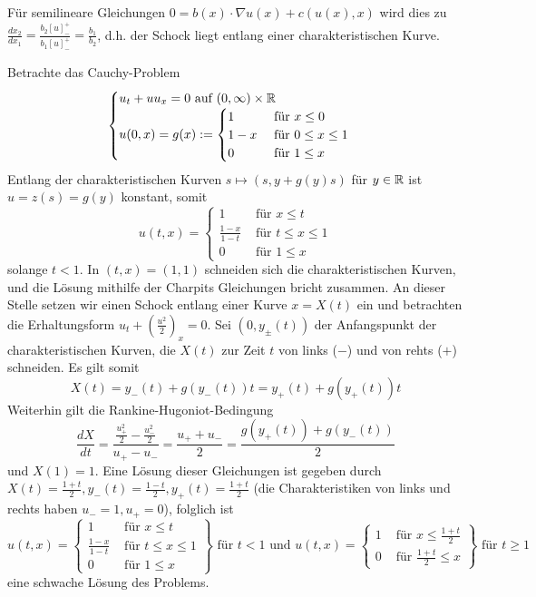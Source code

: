 \begin{bem} \label{bem_17}
	Für semilineare Gleichungen \marginnote{[17]} $0 = b(x) \cdot \nabla u(x) + c(u(x),x)$ wird dies zu $\frac{dx_2}{dx_1} = \frac{b_2[u]_-^+}{b_1[u]_-^+} = \frac{b_1}{b_2}$, d.h. der Schock liegt entlang einer charakteristischen Kurve.
\end{bem}
	
\begin{bsp} \label{bsp_18}
	Betrachte das Cauchy-Problem \marginnote{[18]}
	\[ \begin{cases}
		u_t+uu_x = 0 \text{ auf } (0,\infty) \times \mathbb{R} \\
		u(0,x) = g(x) := \begin{cases}
			1	& \text{ für } x \leq 0 \\
			1-x & \text{ für } 0 \leq x \leq 1 \\
			0	& \text{ für } 1 \leq x \end{cases} \end{cases} \]
	Entlang der charakteristischen Kurven $s \mapsto (s,y+g(y)s)$ für $y \in \mathbb{R}$ ist $u = z(s) = g(y)$ konstant, somit
	\[ u(t,x) = \begin{cases}
		1	&	\text{ für } x \leq t \\
		\frac{1-x}{1-t} & \text{ für } t \leq x \leq 1 \\
		0	&	\text{ für } 1 \leq x \end{cases} \]
	solange $t < 1$. In $(t,x) = (1,1)$ schneiden sich die charakteristischen Kurven, und die Lösung mithilfe der Charpits Gleichungen bricht zusammen. An dieser Stelle setzen wir einen Schock entlang einer Kurve $x = X(t)$ ein und betrachten die Erhaltungsform $u_t + \left( \frac{u^2}{2} \right)_x = 0$. Sei $(0,y_\pm(t))$ der Anfangspunkt der charakteristischen Kurven, die $X(t)$ zur Zeit $t$ von links ($-$) und von rehts ($+$) schneiden. Es gilt somit
	\[ X(t) = y_-(t) + g(y_-(t))t = y_+(t) + g(y_+(t))t \]
	Weiterhin gilt die Rankine-Hugoniot-Bedingung
	\[ \frac{dX}{dt} = \frac{\frac{u_+^2}{2}-\frac{u_-^2}{2}}{u_+ - u_-} = \frac{u_+ + u_-}{2} = \frac{g(y_+(t)) + g(y_-(t))}{2} \]
	und $X(1)=1$. Eine Lösung dieser Gleichungen ist gegeben durch $X(t) = \frac{1+t}{2}, y_-(t) = \frac{1-t}{2}, y_+(t) = \frac{1+t}{2}$ (die Charakteristiken von links und rechts haben $u_-=1, u_+ = 0$), folglich ist
	\[ u(t,x) = \left. \begin{cases}
		1	&	\text{ für } x \leq t \\
		\frac{1-x}{1-t}	&	\text{ für } t \leq x \leq 1 \\
		0	&	\text{ für } 1 \leq x \end{cases} \right\} \text{ für } t<1 \text{ und } u(t,x) = \left. \begin{cases}
		1	&	\text{ für } x \leq \frac{1+t}{2} \\
		0	&	\text{ für } \frac{1+t}{2} \leq x \end{cases} \right\} \text{ für } t \geq 1 \]
	eine schwache Lösung des Problems.
\end{bsp}
	
